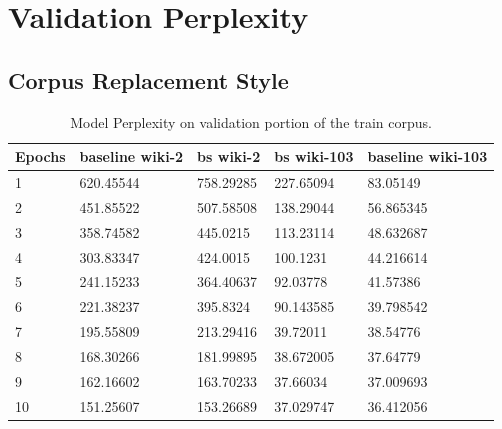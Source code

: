 \documentclass [11pt, proquest] {uwthesis}[2020/12/20]
\begin{document}
\section{Validation Perplexity}
\subsection{Corpus Replacement Style}
\begin{table}[!h]
\begin{tabular}{|l|l|l|l|l|}
\hline 
Epochs & baseline wiki-2 & bs wiki-2 & bs wiki-103 & baseline wiki-103 \\ \hline \hline  
1  & 620.45544 & 758.29285 & 227.65094 & 83.05149  \\ \hline 
2  & 451.85522 & 507.58508 & 138.29044 & 56.865345 \\ \hline 
3  & 358.74582 & 445.0215  & 113.23114 & 48.632687 \\ \hline  
4  & 303.83347 & 424.0015  & 100.1231  & 44.216614 \\ \hline  
5  & 241.15233 & 364.40637 & 92.03778  & 41.57386  \\ \hline  
6  & 221.38237 & 395.8324  & 90.143585 & 39.798542 \\ \hline 
7  & 195.55809 & 213.29416 & 39.72011  & 38.54776  \\ \hline  
8  & 168.30266 & 181.99895 & 38.672005 & 37.64779  \\ \hline 
9  & 162.16602 & 163.70233 & 37.66034  & 37.009693 \\ \hline 
10 & 151.25607 & 153.26689 & 37.029747 & 36.412056 \\ \hline 
\end{tabular}
\label{table:corpuscurriculaperplexity}
\caption{Model Perplexity on validation portion of the train corpus.}
\end{table}
\end{document}
